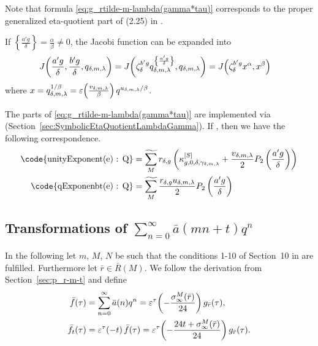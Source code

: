 \documentclass{article}
\begin{document}
Note that formula \eqref{eq:g_rtilde-m-lambda(gamma*tau)} corresponds
to the proper generalized eta-quotient part of (2.25) in
\cite{ChenDuZhao_FindingModularFunctionsRamanujan_2019}.

If $\left\{\frac{a'g}{\delta}\right\} = \frac{\alpha}{\beta} \ne 0$,
the Jacobi function can be expanded into
\begin{align}
  \jacobiAlpha{\frac{a' g}{\delta}}{\frac{b' g}{\delta}}{q_{\delta,m,\lambda}}
  &=
  \jacobiFunction{
      \zeta_\delta^{b' g} q_{\delta,m,\lambda}^{\left\{\frac{a' g}{\delta}\right\}}
      }{q_{\delta,m,\lambda}}
  =
    \jacobiFunction{\zeta_\delta^{b' g} x^{\alpha}}{x^{\beta}}
    \label{eq:minimalRootOfUnity-g_rtilde-m-lambda}
\end{align}
where
$x = q_{\delta,m,\lambda}^{1/\beta} =
\unityPower{\frac{v_{\delta,m,\lambda}}{\beta}} q^{u_{\delta,m,\lambda}/\beta}$.




The parts of \eqref{eq:g_rtilde-m-lambda(gamma*tau)} are
implemented via
\textcolor{blue}{}
(Section~\ref{sec:SymbolicEtaQuotientLambdaGamma}).
%
If , then
we have the following correspondence.
\begin{align*}
  \text{\code{unityExponent(e) : Q}}
  &=
    \gensum[M]
    r_{\delta,g}
    \left(
    \kappa_{g,0,\delta,\gamma_{\delta,m,\lambda}}^{[S]}
    +
    \frac{v_{\delta,m,\lambda}}{2} P_2\left(\frac{a' g}{\delta}\right)
    \right)
  \\
  \text{\code{qExponenbt(e) : Q}}
  &=
    \gensum[M]
    \frac{r_{\delta,g} u_{\delta,m,\lambda}}{2} P_2\left(\frac{a' g}{\delta}\right)
\end{align*}



\subsection{Transformations of $\sum_{n=0}^\infty \bar{a}(mn+t) q^n$}
\label{sec:p_rbar-m-t}

In the following let $m$, $M$, $N$ be such that the conditions 1-10 of
Section~10 in
\cite{ChenDuZhao_FindingModularFunctionsRamanujan_2019} are
fulfilled.
Furthermore let $\bar{r}\in\bar{R}(M)$.
%
We follow the derivation from Section~\ref{sec:p_r-m-t} and
define
\begin{align*}
  \bar{f}(\tau)
  &=
  \sum_{n=0}^\infty \bar{a}(n) q^n
    =
    \unityPowerTau{-\frac{\sigmainfty[M]{\bar{r}}}{24}} g_{\bar{r}}(\tau),
  \\
  \bar{f}_t(\tau)
  &=
    \unityPowerTau{- t} \bar{f}(\tau)
    =
    \unityPowerTau{-\frac{24t + \sigmainfty[M]{\bar{r}}}{24}} g_{\bar{r}}(\tau).
\end{align*}
\end{document}
